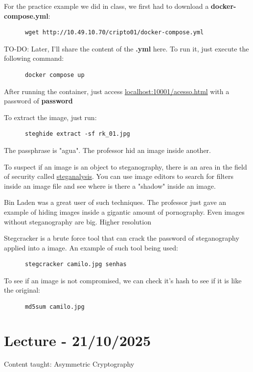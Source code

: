 \documentclass{article}
\begin{document}
For the practice example we did in class, we first had to download a \textbf{docker-compose.yml}:

\begin{verbatim}
      wget http://10.49.10.70/cripto01/docker-compose.yml
\end{verbatim}

TO-DO: Later, I'll share the content of the \textbf{.yml} here. To run it, just execute the following command:

\begin{verbatim}
      docker compose up
\end{verbatim}

After running the container, just access \href{http://localhost:10001/acesso.html}{localhost:10001/acesso.html} with a password of \textbf{password}

To extract the image, just run:

\begin{verbatim}
      steghide extract -sf rk_01.jpg
\end{verbatim}

The passphrase is "agua". The professor hid an image inside another.

To suspect if an image is an object to steganography, there is an area in the field of security called \href{https://en.wikipedia.org/wiki/Steganalysis}{steganalysis}. You can use image editors to search for filters inside an image file and see where is there a "shadow" inside an image.

Bin Laden was a great user of such techniques. The professor just gave an example of hiding images inside a gigantic amount of pornography. Even images without steganography are big. Higher resolution 

Stegcracker is a brute force tool that can crack the password of steganography applied into a image. An example of such tool being used:

\begin{verbatim}
      stegcracker camilo.jpg senhas
\end{verbatim}

To see if an image is not compromised, we can check it's hash to see if it is like the original:
\begin{verbatim}
      md5sum camilo.jpg
\end{verbatim}

\section{Lecture - 21/10/2025}
Content taught: Asymmetric Cryptography
\end{document}
